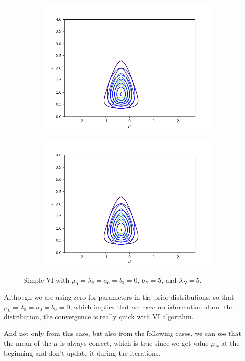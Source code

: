 \documentclass[11pt]{extarticle}
\newcommand{\0}{\mathbf{0}}
\renewcommand{\(}{\left(}
\renewcommand{\)}{\right)}
\theoremstyle{definition}
\begin{document}
\begin{enumerate}
\begin{figure}[!ht]
\begin{subfigure}{.4\textwidth}
		\end{subfigure}
		\begin{subfigure}{.4\textwidth}
			\centering
			\includegraphics[width=\linewidth]{2_4_1_3}
		\end{subfigure}
		\begin{subfigure}{.4\textwidth}
			\centering
			\includegraphics[width=\linewidth]{2_4_1_6}
		\end{subfigure}
		\caption{Simple VI with $\mu_{0} = \lambda_{0} = a_{0} = b_{0} = 0$, $b_{N} = 5$, and $\lambda_{N} = 5$.}
		\label{fig:2_4_1}
	\end{figure}
	\par Although we are using zero for parameters in the prior distributions, so that $\mu_{0} = \lambda_{0} = a_{0} = b_{0} = 0$, which implies that we have no information about the distribution, the convergence is really quick with VI algorithm.
	\par And not only from this case, but also from the following cases, we can see that the mean of the $\mu$ is always correct, which is true since we get value $\mu_{N}$ at the beginning and don't update it during the iterations.


\end{enumerate}
\end{document}

